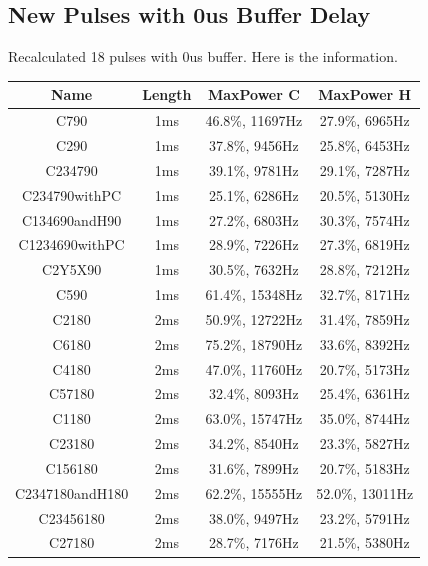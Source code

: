 \documentclass[prl,onecolumn]{revtex4-1}
\begin{document}
\subsection{New Pulses with 0us Buffer Delay}

Recalculated 18 pulses with 0us buffer. Here is the information.
\begin{table}[!h]
\begin{tabular} {c||c|c|c}
  \hline
  Name & Length & MaxPower C & MaxPower H\\
  \hline
  C790 & 1ms & 46.8\%, 11697Hz & 27.9\%, 6965Hz\\
  C290 & 1ms & 37.8\%, 9456Hz & 25.8\%, 6453Hz\\
  C234790 & 1ms & 39.1\%, 9781Hz & 29.1\%, 7287Hz\\
  C234790withPC & 1ms & 25.1\%, 6286Hz & 20.5\%, 5130Hz\\
  C134690andH90 & 1ms & 27.2\%, 6803Hz & 30.3\%, 7574Hz\\
  C1234690withPC & 1ms & 28.9\%, 7226Hz & 27.3\%, 6819Hz\\
  C2Y5X90 & 1ms & 30.5\%, 7632Hz & 28.8\%, 7212Hz\\
  C590 & 1ms & 61.4\%, 15348Hz & 32.7\%, 8171Hz\\
  C2180 & 2ms & 50.9\%, 12722Hz & 31.4\%, 7859Hz\\
  C6180 & 2ms & 75.2\%, 18790Hz & 33.6\%, 8392Hz\\
  C4180 & 2ms & 47.0\%, 11760Hz & 20.7\%, 5173Hz\\
  C57180 & 2ms & 32.4\%, 8093Hz & 25.4\%, 6361Hz\\
  C1180 & 2ms & 63.0\%, 15747Hz & 35.0\%, 8744Hz\\
  C23180 & 2ms & 34.2\%, 8540Hz & 23.3\%, 5827Hz\\
  C156180 & 2ms & 31.6\%, 7899Hz & 20.7\%, 5183Hz\\
  C2347180andH180 & 2ms & 62.2\%, 15555Hz & 52.0\%, 13011Hz\\
  C23456180 & 2ms & 38.0\%, 9497Hz & 23.2\%, 5791Hz\\
  C27180 & 2ms & 28.7\%, 7176Hz & 21.5\%, 5380Hz\\
  \hline
\end{tabular}
\end{table}

\begin{thebibliography}{99}

\end{thebibliography}
\end{document}
